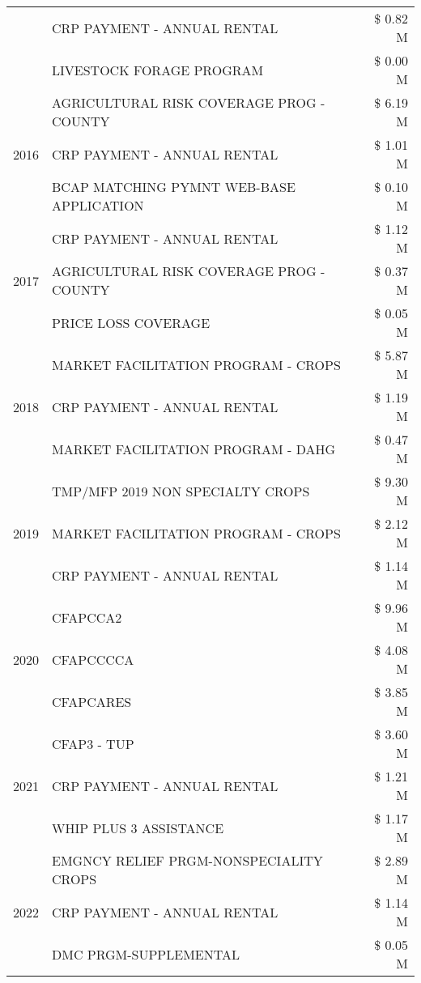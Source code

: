 \begin{tabular}{llr}
 & CRP PAYMENT - ANNUAL RENTAL & \$ 0.82 M \\
 & LIVESTOCK FORAGE PROGRAM & \$ 0.00 M \\
\cline{1-3}
\multirow[t]{3}{*}{2016} & AGRICULTURAL RISK COVERAGE PROG - COUNTY & \$ 6.19 M \\
 & CRP PAYMENT - ANNUAL RENTAL & \$ 1.01 M \\
 & BCAP MATCHING PYMNT WEB-BASE APPLICATION & \$ 0.10 M \\
\cline{1-3}
\multirow[t]{3}{*}{2017} & CRP PAYMENT - ANNUAL RENTAL & \$ 1.12 M \\
 & AGRICULTURAL RISK COVERAGE PROG - COUNTY & \$ 0.37 M \\
 & PRICE LOSS COVERAGE & \$ 0.05 M \\
\cline{1-3}
\multirow[t]{3}{*}{2018} & MARKET FACILITATION PROGRAM - CROPS & \$ 5.87 M \\
 & CRP PAYMENT - ANNUAL RENTAL & \$ 1.19 M \\
 & MARKET FACILITATION PROGRAM - DAHG & \$ 0.47 M \\
\cline{1-3}
\multirow[t]{3}{*}{2019} & TMP/MFP 2019 NON SPECIALTY CROPS & \$ 9.30 M \\
 & MARKET FACILITATION PROGRAM - CROPS & \$ 2.12 M \\
 & CRP PAYMENT - ANNUAL RENTAL & \$ 1.14 M \\
\cline{1-3}
\multirow[t]{3}{*}{2020} & CFAPCCA2 & \$ 9.96 M \\
 & CFAPCCCCA & \$ 4.08 M \\
 & CFAPCARES & \$ 3.85 M \\
\cline{1-3}
\multirow[t]{3}{*}{2021} & CFAP3 - TUP & \$ 3.60 M \\
 & CRP PAYMENT - ANNUAL RENTAL & \$ 1.21 M \\
 & WHIP PLUS 3 ASSISTANCE & \$ 1.17 M \\
\cline{1-3}
\multirow[t]{3}{*}{2022} & EMGNCY RELIEF PRGM-NONSPECIALITY CROPS & \$ 2.89 M \\
 & CRP PAYMENT - ANNUAL RENTAL & \$ 1.14 M \\
 & DMC PRGM-SUPPLEMENTAL & \$ 0.05 M \\
\cline{1-3}
\bottomrule
\end{tabular}
